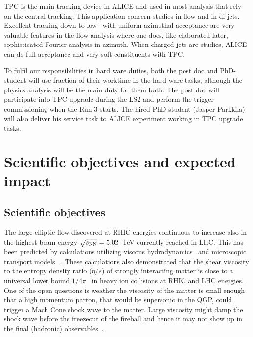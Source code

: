 TPC is the main tracking device in ALICE and used in most analysis that rely on the central tracking. This application concern studies in flow and in di-jets. Excellent tracking down to low-\pt{}\ with uniform azimuthal acceptance are very valuable features in the flow analysis where one does, like elaborated later, sophisticated Fourier analysis in azimuth. When charged jets are studies, ALICE can do full acceptance and very soft constituents with TPC.

To fulfil our responsibilities in hard ware duties, both the post doc and PhD-student will use fraction of their worktime in the hard ware tasks, although the physics analysis will be the main duty for them both. The post doc will participate into TPC upgrade during the LS2 and perform the trigger commissioning when the Run 3 starts. The hired PhD-student (Jasper Parkkila) will also deliver his service task to ALICE experiment working in TPC upgrade tasks.

\section{Scientific objectives and expected impact} %
\label{sec:objectives}

\subsection{Scientific objectives}

The large elliptic flow discovered at RHIC energies continuous to increase also in the highest beam energy $\sqrt{s_{\rm NN}}=5.02$~TeV currently reached in LHC. This has been predicted by calculations utilizing viscous hydrodynamics~\cite{PhysRevLett.99.172301} and microscopic transport models ~\cite{PhysRevLett.101.082302}.  These calculations also demonstrated that the shear viscosity to the entropy density ratio ($\eta/s$) of strongly interacting matter is close to a universal lower bound $1/4\pi$~\cite{PhysRevLett.94.111601} in heavy ion collisions at RHIC and LHC energies. One of the open questions is weather the viscosity of the matter is small enough that a high momentum parton, that would be supersonic in the QGP, could trigger a Mach Cone shock wave to the matter. Large viscosity might damp the shock wave before the freezeout of the fireball and hence it may not show up in the final (hadronic) observables~\cite{Bouras:2010nt,Bouras:2012mh,PhysRevC.90.024904}.

